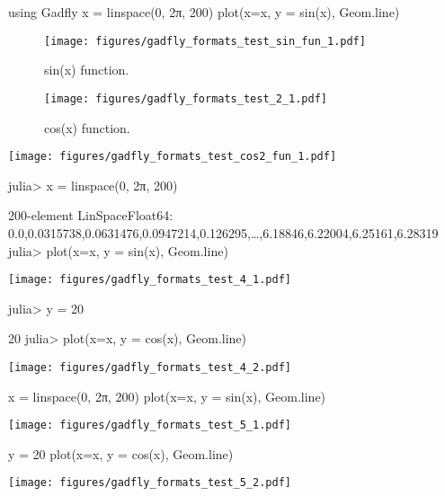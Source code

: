 

\begin{juliacode}
using Gadfly
x = linspace(0, 2π, 200)
plot(x=x, y = sin(x), Geom.line)
\end{juliacode}
\begin{figure}[ht]
\center
\texttt{[image: figures/gadfly\_formats\_test\_sin\_fun\_1.pdf]}
\caption{sin(x) function.}
\label{fig:sin_fun}
\end{figure}



\begin{figure}[htpb]
\center
\texttt{[image: figures/gadfly\_formats\_test\_2\_1.pdf]}
\caption{cos(x) function.}
\end{figure}



\texttt{[image: figures/gadfly\_formats\_test\_cos2\_fun\_1.pdf]}



\begin{juliaterm}
julia> x = linspace(0, 2π, 200)

200-element LinSpace{Float64}:
 0.0,0.0315738,0.0631476,0.0947214,0.126295,…,6.18846,6.22004,6.25161,6.28319
julia> plot(x=x, y = sin(x), Geom.line)

\end{juliaterm}
\texttt{[image: figures/gadfly\_formats\_test\_4\_1.pdf]}

\begin{juliaterm}
julia> y = 20

20
julia> plot(x=x, y = cos(x), Geom.line)
\end{juliaterm}
\texttt{[image: figures/gadfly\_formats\_test\_4\_2.pdf]}



\begin{juliacode}
x = linspace(0, 2π, 200)
plot(x=x, y = sin(x), Geom.line)

\end{juliacode}
\texttt{[image: figures/gadfly\_formats\_test\_5\_1.pdf]}

\begin{juliacode}
y = 20
plot(x=x, y = cos(x), Geom.line)
\end{juliacode}
\texttt{[image: figures/gadfly\_formats\_test\_5\_2.pdf]}
